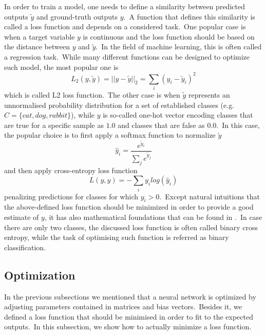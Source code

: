 \documentclass[longabstract, english, mgr]{iithesis}
\theoremstyle{default_theorem_style}\newtheorem{theorem}{Theorem}
\theoremstyle{default_theorem_style}\newtheorem{definition}{Definition}
\begin{document}
In order to train a model, one needs to define a similarity between predicted outputs $\tilde{y}$ and ground-truth
outputs $y$.\ A function that defines this similarity is called a loss function and depends on a considered
task.\ One popular case is when a target variable $y$ is continuous and the loss function should be based on the
distance between $y$ and $\tilde{y}$.\ In the field of machine learning, this is often called a regression
task.\ While many different functions can be designed to optimize such model, the most popular one is
$$
L_2(y, \tilde{y}) = ||y - \tilde{y}||_2 = \sum_i (y_i - \tilde{y}_i)^2
$$
which is called L2 loss function.\ The other case is when $\tilde{y}$ represents an unnormalised probability
distribution for a set of established classes (e.g.\ $C = \{cat, dog, rabbit\}$), while $y$ is so-called one-hot
vector encoding classes that are true for a specific sample as $1.0$ and classes that are false as $0.0$.\ In
this case, the popular choice is to first apply a softmax function to normalize $\tilde{y}$
$$
\hat{y}_i = \frac{e^{\tilde{y}_i}}{\sum_j e^{\tilde{y}_j}}
$$
and then apply cross-entropy loss function
$$
L(y, \hat{y}) = -\sum_i y_i log(\hat{y}_i)
$$
penalizing predictions for classes for which $y_i > 0$.\ Except natural intuitions that the above-defined loss
function should be minimized in order to provide a good estimate of $y$, it has also mathematical foundations that
can be found in \cite{goodfellow_book}.\ In case there are only two classes, the discussed loss function is often
called binary cross entropy, while the task of optimising such function is referred as binary classification.

\subsection{Optimization}\label{subsec:optimization}

In the previous subsections we mentioned that a neural network is optimized by adjusting parameters contained in
matrices and bias vectors.\ Besides it, we defined a loss function that should be minimised in order to fit to the
expected outputs.\ In this subsection, we show how to actually minimize a loss function.\newline
\end{document}
